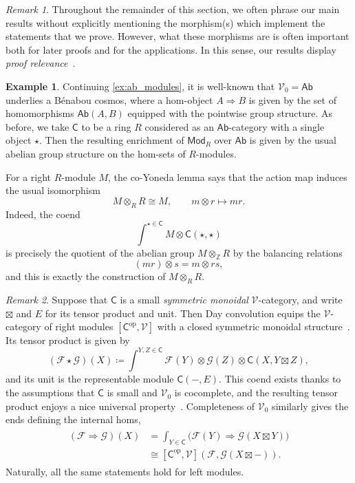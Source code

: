\documentclass[11pt,onecolumn]{article}
\newcommand{\Z}{\mathbb{Z}}
\newcommand{\cV}{\mathscr{V}}
\newcommand{\cC}{\mathsf{C}}
\newcommand{\op}{\mathrm{op}}
\newcommand{\Ab}{\mathsf{Ab}}
\newcommand{\Mod}{\mathsf{Mod}}
\theoremstyle{plain}
\theoremstyle{remark}
\newtheorem{remark}[remark]{Remark}
\theoremstyle{definition}
\newtheorem{example}[example]{Example}
\begin{document}
\begin{remark}
Throughout the remainder of this section,
we often phrase our main results without explicitly mentioning the morphism(s) which implement the statements that we prove.
However, what these morphisms are is often important both for later proofs and for the applications.
In this sense, our results display \emph{proof relevance}~\cite{nLabProofRelevance}.
\end{remark}

\begin{example}
	\label{ex:co_yoneda_ab}
	Continuing \cref{ex:ab_modules}, it is well-known that $\cV_0=\Ab$ underlies a B\'enabou cosmos,
	where a hom-object $A \Rightarrow B$ is given by the set of homomorphisms $\Ab(A, B)$ equipped with the pointwise group structure.
	As before, we take $\cC$ to be a ring $R$ considered as an $\Ab$-category with a single object $\star$.
	Then the resulting enrichment of $\Mod_R$ over $\Ab$ is given by the usual abelian group structure on the hom-sets of $R$-modules.

	For a right $R$-module $M$, the co-Yoneda lemma says that the action map induces the usual isomorphism
	\[
		M \otimes_R R \cong M,
		\qquad
		m \otimes r \longmapsto mr.
	\]
	Indeed, the coend
	\[
		\int^{\star \in \cC} M \otimes \cC(\star,\star)
	\]
	is precisely the quotient of the abelian group $M \otimes_{\Z} R$ by the balancing relations
	\[
		(mr)\otimes s = m \otimes rs,
	\]
	and this is exactly the construction of $M \otimes_R R$.
\end{example}

\begin{remark}
	\label{rem:day_convolution}
	Suppose that $\cC$ is a small \emph{symmetric monoidal} $\cV$-category, and write $\boxtimes$ and $E$ for its tensor product and unit.
	Then Day convolution equips the $\cV$-category of right modules $[\cC^\op,\cV]$ with a closed symmetric monoidal structure~\cite[Thm.~3.3 and \S 4]{DayClosedFunctorCategories}.
	Its tensor product is given by
	\[
		(\mathcal{F}\star\mathcal{G})(X)
		\coloneqq
		\int^{Y,Z\in\cC}
		\mathcal{F}(Y)\otimes\mathcal{G}(Z)\otimes\cC(X,Y\boxtimes Z),
	\]
	and its unit is the representable module $\cC(-,E)$.
	This coend exists thanks to the assumptions that $\cC$ is small and $\cV_0$ is cocomplete, and the resulting tensor product enjoys a nice universal property~\cite[Lem.~9.8.2]{RichterCategoriesHomotopy}.
	Completeness of $\cV_0$ similarly gives the ends defining the internal homs,
	\begin{align}
		\label{eq:day_convolution_internal_hom}
		\begin{split}
			(\mathcal{F}\Rightarrow\mathcal{G})(X)
			& =
			\int_{Y\in\cC} \bigl(\mathcal{F}(Y)\Rightarrow\mathcal{G}(X\boxtimes Y)\bigr) \\[3pt]
			& \cong
			[\cC^\op,\cV](\mathcal{F},\mathcal{G}(X\boxtimes -)).
		\end{split}
	\end{align}
	Naturally, all the same statements hold for left modules.
\end{remark}
\end{document}
